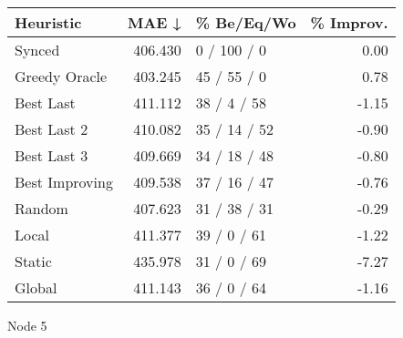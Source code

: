 \begin{tabular}{lrlr}
\toprule
\textbf{Heuristic} & \textbf{MAE ↓} & \textbf{\% Be/Eq/Wo} & \textbf{\% Improv.} \\
\midrule
            Synced &        406.430 &          0 / 100 / 0 &                0.00 \\
     Greedy Oracle &        403.245 &          45 / 55 / 0 &                0.78 \\
         Best Last &        411.112 &          38 / 4 / 58 &               -1.15 \\
       Best Last 2 &        410.082 &         35 / 14 / 52 &               -0.90 \\
       Best Last 3 &        409.669 &         34 / 18 / 48 &               -0.80 \\
    Best Improving &        409.538 &         37 / 16 / 47 &               -0.76 \\
            Random &        407.623 &         31 / 38 / 31 &               -0.29 \\
             Local &        411.377 &          39 / 0 / 61 &               -1.22 \\
            Static &        435.978 &          31 / 0 / 69 &               -7.27 \\
            Global &        411.143 &          36 / 0 / 64 &               -1.16 \\
\bottomrule
\end{tabular}
\caption{Node 5}
\label{tab:non_lr05_le2_bs4_5}
